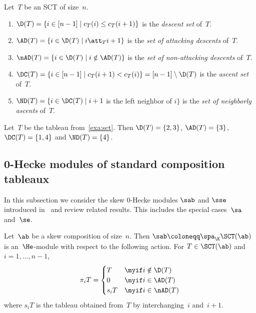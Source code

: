 \begin{defi}
	\label{thm:descents}
	 Let~$T$ be an SCT of size~$n$.
	\begin{enumerate}
		\item $\D(T) = \{i\in [n-1] \mid c_T(i) \leq c_T(i+1)\}$ is the \emph{descent set} of~$T$.
		\item $\AD(T) = \{i\in \D(T) \mid i\att_T i+1 \}$ is the \emph{set of attacking descents} of~$T$.
		\item $\nAD(T) = \{i\in \D(T) \mid i \notin \AD(T) \}$ is the \emph{set of non-attacking descents} of~$T$.
		\item[(1$'$)] $\DC(T) = \{i\in [n-1] \mid c_T(i+1) < c_T(i)\} = [n-1]\setminus \D(T)$ is the \emph{ascent set} of~$T$.
		\item[(2$'$)] $\ND(T) = \{i\in \DC(T) \mid i+1$ is the left neighbor of $i\}$ is the \emph{set of neighborly ascents} of~$T$.
	\end{enumerate}
\end{defi}

\begin{exam}
Let~$T$ be the tableau from~\cref{exa:sct}. Then
	$\D(T) = \{2,3\}$, 
	$\AD(T) = \{3\}$, 
	$\DC(T) =\{1,4\}$ and
	$\ND(T) = \{4\}$. 
\end{exam}


\subsection{0-Hecke modules of standard composition tableaux}

In this subsection we consider the skew 0-Hecke modules $\sab$ and $\sse$ introduced in~\cite{Tewari2015} and review related results. This includes the special cases~$\sa$ and~$\se$.

\begin{thm}
	\label{thm:sct_modules}
	Let~$\ab$ be a skew composition of size~$n$. 
	Then $\sab\coloneqq \spa_\K \SCT(\ab)$ is an~$\He$-module with respect to the following action. For $T\in \SCT(\ab)$ and $i=1,\dots, n-1$,
	\begin{align*}
	\pi_i T = 
	\begin{cases}
	T &\myif i \notin \D(T) \\
	0 &\myif i \in \AD(T) \\ 
	s_iT &\myif i \in \nAD(T) 
	\end{cases}
	\end{align*}
	where $s_iT$ is the tableau obtained from~$T$ by interchanging~$i$ and~$i+1$.
\end{thm}

